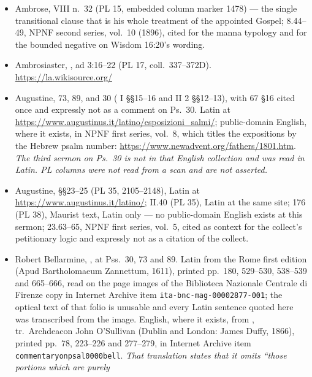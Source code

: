 \begin{itemize}[leftmargin=1.2em, itemsep=0.15em]
\item Ambrose,  VIII n.~32 (PL 15,
embedded column marker 1478) --- the single transitional clause that is his
whole treatment of the appointed Gospel;
 8.44--49, NPNF second series, vol.~10 (1896), cited for
the manna typology and for the bounded negative on Wisdom 16:20's wording.
\item Ambrosiaster, , ad 3:16--22
(PL 17, coll.\ 337--372D). \url{https://la.wikisource.org/}
\item Augustine,  73, 89, and 30
( I §§15--16 and  II  2
§§12--13), with  67 §16 cited once and expressly not as a
comment on Ps.~30. Latin at \url{https://www.augustinus.it/latino/esposizioni_salmi/};
public-domain English, where it exists, in NPNF first series, vol.~8, which
titles the expositions by the Hebrew psalm number:
\url{https://www.newadvent.org/fathers/1801.htm}. \textit{The third sermon on
Ps.~30 is not in that English collection and was read in Latin. PL columns were
not read from a scan and are not asserted.}
\item Augustine,  §§23--25 (PL 35,
2105--2148), Latin at \url{https://www.augustinus.it/latino/};
 II.40 (PL 35), Latin at the same site;
 176 (PL 38), Maurist text, Latin only --- no public-domain
English exists at this sermon;
 23.63--65, NPNF first series, vol.~5, cited as
context for the collect's petitionary logic and expressly not as a citation of
the collect.
\item Robert Bellarmine, , at Pss.\ 30, 73 and 89.
Latin from the Rome first edition (Apud Bartholomaeum Zannettum, 1611), printed
pp.\ 180, 529--530, 538--539 and 665--666, read on the page images of the
Biblioteca Nazionale Centrale di Firenze copy in Internet Archive item
\texttt{ita-bnc-mag-00002877-001}; the optical text of that folio is unusable
and every Latin sentence quoted here was transcribed from the image. English,
where it exists, from , tr.\ Archdeacon
John O'Sullivan (Dublin and London: James Duffy, 1866), printed pp.\ 78, 223--226
and 277--279, in Internet Archive item \texttt{commentaryonpsal0000bell}.
\textit{That translation states that it omits ``those portions which are purely
}
\end{itemize}
